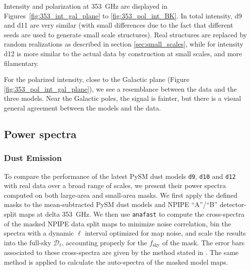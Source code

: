 \documentclass[twocolumn]{aastex631}
\begin{document}
Intensity and polarization at 353~GHz are displayed in Figures~\ref{fig:353_int_gal_plane} to \ref{fig:353_pol_int_BK}. 
In total intensity, d9 and d11 are very similar (with small differences due to the fact that different seeds are used to generate small scale structures). Real structures are replaced by random realizations as described in section \ref{sec:small_scales}, while for intensity d12 is more similar to the actual data by construction at small scales, and more filamentary. 

For the polarized intensity, close to the Galactic plane (Figure \ref{fig:353_pol_int_gal_plane}), we see a resemblance between the data and the three models. Near the Galactic poles, the signal is fainter, but there is a visual general agreement between the models and the data. 

\subsection{Power spectra}
\label{sec:PS-validation}

\subsubsection{Dust Emission}
To compare the performance of the latest PySM dust models \texttt{d9}, \texttt{d10} and \texttt{d12} with real data over a broad range of scales, we present their power spectra computed on both large-area and small-area masks. We first apply the defined masks to the mean-subtracted PySM dust models and NPIPE ``A''/``B'' detector-split maps at delta 353~GHz. We then use \texttt{anafast} to compute the cross-spectra of the masked NPIPE data split maps to minimize noise correlation, bin the spectra with a dynamic $\ell$ interval optimized for map noise, and scale the results into the full-sky $\mathcal{D}_\ell$, accounting properly for the $f_{\mathrm{sky}}$ of the mask. The error bars associated to these cross-spectra are given by the method stated in \cite{Tristram:2005}. The same method is applied to calculate the auto-spectra of the masked model maps. 

\end{document}
